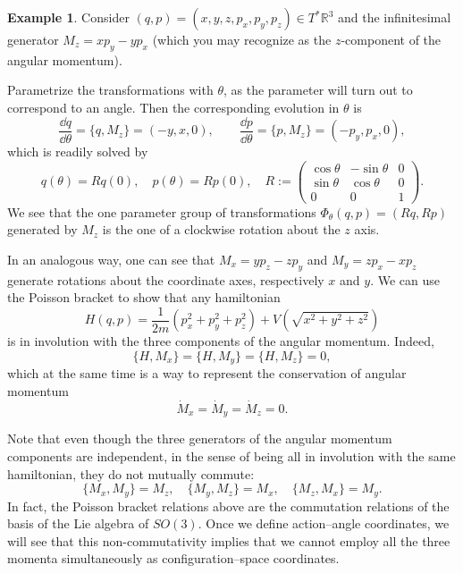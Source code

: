 \documentclass[english,fontsize=11pt,paper=b5]{scrbook}
\theoremstyle{definition}
\newtheorem{example}{Example}[chapter]
\begin{document}
    \begin{example}
      Consider $(q,p) = (x,y,z,p_x,p_y,p_z)\in T^* \mathbb{R}^3$ and the infinitesimal generator $M_z = x p_y - y p_x$ (which you may recognize as the $z$-component of the angular momentum).

      Parametrize the transformations with $\theta$, as the parameter will turn out to correspond to an angle. Then the corresponding evolution in $\theta$ is
      \begin{equation}
        \frac{\dd q}{\dd\theta} = \big\{q, M_z\big\} = (-y, x, 0),\qquad
        \frac{\dd p}{\dd\theta} = \big\{p, M_z\big\} = (-p_y, p_x, 0),
      \end{equation}
      which is readily solved by
      \begin{equation}
        q(\theta)= R q(0), \quad p(\theta) = R p(0), \quad
        R := \begin{pmatrix}
          \cos\theta & -\sin\theta & 0 \\
          \sin\theta & \cos\theta  & 0 \\
          0          & 0           & 1
        \end{pmatrix}.
      \end{equation}
      We see that the one parameter group of transformations $\Phi_\theta(q,p) = (Rq, Rp)$ generated by $M_z$ is the one of a clockwise rotation about the $z$ axis.

      In an analogous way, one can see that $M_x = yp_z-zp_y$ and $M_y = zp_x - xp_z$ generate rotations about the coordinate axes, respectively $x$ and $y$.
      We can use the Poisson bracket to show that any hamiltonian
      \begin{equation}
        H(q,p) = \frac1{2m}\left(p_x^2 + p_y^2 + p_z^2\right) + V\left(\sqrt{x^2 + y^2 + z^2}\right)
      \end{equation}
      is in involution with the three components of the angular momentum. Indeed,
      \begin{equation}
        \big\{H,M_x\big\} = \big\{H,M_y\big\} = \big\{H,M_z\big\} = 0,
      \end{equation}
      which at the same time is a way to represent the conservation of angular momentum
      \begin{equation}
        \dot M_x = \dot M_y = \dot M_z = 0.
      \end{equation}

      Note that even though the three generators of the angular momentum components are independent, in the sense of being all in involution with the same hamiltonian, they do not mutually commute:
      \begin{equation}\label{eq:commM}
        \big\{M_x, M_y\big\} = M_z, \quad
        \big\{M_y, M_z\big\} = M_x, \quad
        \big\{M_z, M_x\big\} = M_y.
      \end{equation}
      In fact, the Poisson bracket relations above are the commutation relations of the basis of the Lie algebra of $SO(3)$. %
      Once we define action--angle coordinates, we will see that this non-commutativity implies that we cannot employ all the three momenta simultaneously as configuration--space coordinates.


\end{example}
\end{document}
